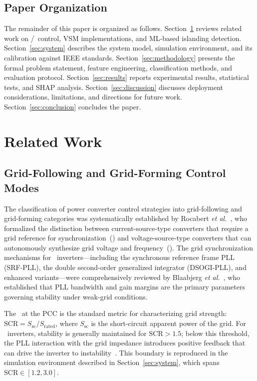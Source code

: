 \documentclass[journal]{IEEEtran}
\newcommand{\scr}{\text{SCR}}
\newcommand{\gfl}{\text{GFL}}
\newcommand{\gfm}{\text{GFM}}
\begin{document}
\subsection{Paper Organization}

The remainder of this paper is organized as follows.
Section~\ref{sec:related} reviews related work on \gfl/\gfm\ control,
VSM implementations, and ML-based islanding detection.
Section~\ref{sec:system} describes the system model, simulation environment,
and its calibration against IEEE standards.
Section~\ref{sec:methodology} presents the formal problem statement,
feature engineering, classification methods, and evaluation protocol.
Section~\ref{sec:results} reports experimental results, statistical tests,
and SHAP analysis.
Section~\ref{sec:discussion} discusses deployment considerations, limitations,
and directions for future work.
Section~\ref{sec:conclusion} concludes the paper.

\section{Related Work}
\label{sec:related}

\subsection{Grid-Following and Grid-Forming Control Modes}

The classification of power converter control strategies into
grid-following and grid-forming categories was systematically established
by Rocabert \textit{et al.}~\cite{b_rocabert2012}, who formalized the
distinction between current-source-type converters that require a grid
reference for synchronization~(\gfl) and voltage-source-type converters
that can autonomously synthesize grid voltage and frequency~(\gfm).
The grid synchronization mechanisms for \gfl\ inverters---including
the synchronous reference frame PLL (SRF-PLL), the double
second-order generalized integrator (DSOGI-PLL), and enhanced
variants---were comprehensively reviewed by
Blaabjerg \textit{et al.}~\cite{b_blaabjerg2006},
who established that PLL bandwidth and gain margins are the primary
parameters governing stability under weak-grid conditions.

The \scr\ at the PCC is the standard metric for characterizing
grid strength: $\scr = S_\text{sc} / S_\text{rated}$,
where $S_\text{sc}$ is the short-circuit apparent power of the grid.
For \gfl\ inverters, stability is generally maintained for $\scr > 1.5$;
below this threshold, the PLL interaction with the grid impedance
introduces positive feedback that can drive the inverter to
instability~\cite{b_rocabert2012}.
This boundary is reproduced in the simulation environment described in
Section~\ref{sec:system}, which spans $\scr \in [1.2, 3.0]$.
\end{document}
